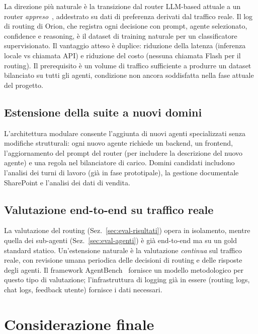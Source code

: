 La direzione più naturale è la transizione dal router LLM-based attuale a un router \emph{appreso}~\cite{ong2024routellm}, 
addestrato su dati di preferenza derivati dal traffico reale. 
Il log di routing di Orion, che registra ogni decisione con prompt, agente selezionato, confidence e reasoning, 
è il dataset di training naturale per un classificatore supervisionato. 
Il vantaggio atteso è duplice: riduzione della latenza (inferenza locale vs chiamata API) e riduzione del costo (nessuna chiamata Flash per il routing). 
Il prerequisito è un volume di traffico sufficiente a produrre un dataset bilanciato su tutti gli agenti, condizione non ancora soddisfatta nella fase attuale del progetto.

\subsection{Estensione della suite a nuovi domini}
\label{subsec:concl-nuovi-domini}

L'architettura modulare consente l'aggiunta di nuovi agenti specializzati senza modifiche strutturali: ogni nuovo agente richiede un backend, un frontend, 
l'aggiornamento del prompt del router (per includere la descrizione del nuovo agente) e una regola nel bilanciatore di carico. 
Domini candidati includono l'analisi dei turni di lavoro (già in fase prototipale), la gestione documentale SharePoint e l'analisi dei dati di vendita.

\subsection{Valutazione end-to-end su traffico reale}
\label{subsec:concl-valutazione-reale}

La valutazione del routing (Sez.~\ref{sec:eval-risultati}) opera in isolamento, mentre quella dei sub-agenti (Sez.~\ref{sec:eval-agenti}) è già end-to-end ma su un gold standard statico. 
Un'estensione naturale è la valutazione \emph{continua} sul traffico reale, con revisione umana periodica delle decisioni di routing e delle risposte degli agenti. 
Il framework AgentBench~\cite{liu2023agentbench} fornisce un modello metodologico per questo tipo di valutazione; l'infrastruttura di logging già in essere (routing logs, chat logs, feedback utente) 
fornisce i dati necessari.

\section{Considerazione finale}
\label{sec:concl-finale}

